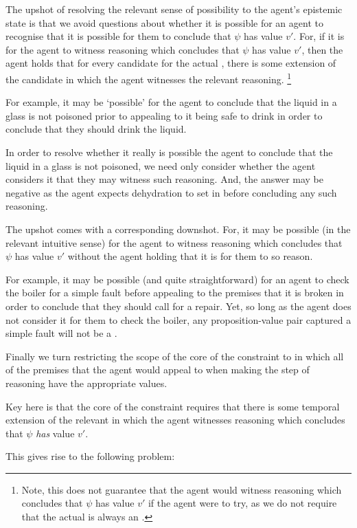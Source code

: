 
\begin{note}
  The upshot of resolving the relevant sense of possibility to the agent's epistemic state is that we avoid questions about whether it is possible for an agent to recognise that it is possible for them to conclude that \(\psi\) has value \(v'\).
  For, if it is \epVAd{} for the agent to witness reasoning which concludes that \(\psi\) has value \(v'\), then the agent holds that for every candidate for the actual \world{}, there is some extension of the candidate \world{} in which the agent witnesses the relevant reasoning.\nolinebreak
  \footnote{
    Note, this does not guarantee that the agent would witness reasoning which concludes that \(\psi\) has value \(v'\) if the agent were to try, as we do not require that the actual \world{} is always an \epVW{}.
  }

  For example, it may be `possible' for the agent to conclude that the liquid in a glass is not poisoned prior to appealing to it being safe to drink in order to conclude that they should drink the liquid.

  In order to resolve whether it really is possible the agent to conclude that the liquid in a glass is not poisoned, we need only consider whether the agent considers it \epVAd{} that they may witness such reasoning.
  And, the answer may be negative as the agent expects dehydration to set in before concluding any such reasoning.
\end{note}

\begin{note}
  The upshot comes with a corresponding downshot.
  For, it may be possible (in the relevant intuitive sense) for the agent to witness reasoning which concludes that \(\psi\) has value \(v'\) without the agent holding that it is \epVAd{} for them to so reason.

  For example, it may be possible (and quite straightforward) for an agent to check the boiler for a simple fault before appealing to the premises that it is broken in order to conclude that they should call for a repair.
  Yet, so long as the agent does not consider it \epVAd{} for them to check the boiler, any proposition-value pair captured a simple fault will not be a \prequ{}.
\end{note}


\begin{note}
  Finally we turn restricting the scope of the core of the constraint to  in which all of the premises that the agent would appeal to when making the step of reasoning have the appropriate values.

  Key here is that the core of the constraint requires that there is some temporal extension of the relevant  in which the agent witnesses reasoning which concludes that \(\psi\) \emph{has} value \(v'\).

  This gives rise to the following problem:
\end{note}

